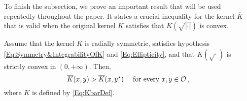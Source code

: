 To finish the subsection, we prove an important result that will be used repeatedly throughout the
paper. It states a crucial inequality for the kernel $\overline{K}$ that is valid when the original
kernel $K$ satisfies that $K(\sqrt{|\cdot|})$ is convex.

\begin{proposition}
\label{Prop:KernelInequalityReflexion} Assume that the kernel $K$ is radially symmetric, satisfies
hypothesis \eqref{Eq:Symmetry&IntegrabilityOfK} and \eqref{Eq:Ellipticity}, and that
$K(\sqrt{\cdot})$ is strictly convex in $(0,+\infty)$. Then,
\begin{equation}
\label{Eq:KernelInequalityReflexion}
\overline{K}(x,y) > \overline{K}(x, y^\star) \quad \text{ for every }x,y \in \mathcal{O}\,,
\end{equation}
where $\overline{K}$ is defined by \eqref{Eq:KbarDef}.
\end{proposition}
